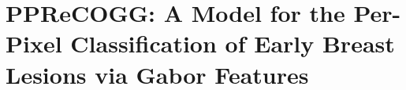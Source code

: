 

\chapter{PPReCOGG: A Model for the Per-Pixel Classification of Early Breast Lesions via Gabor Features}


\newpage


